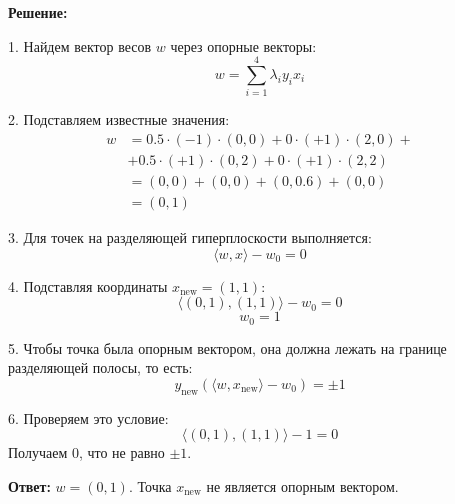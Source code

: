 \textbf{Решение:}
\par 1. Найдем вектор весов \(w\) через опорные векторы:
\begin{equation*}
    w = \sum_{i=1}^4 \lambda_i y_i x_i
\end{equation*}

\par 2. Подставляем известные значения:
\begin{align*}
    w & = 0.5 \cdot (-1) \cdot (0,0) + 0 \cdot (+1) \cdot (2,0) + \\
      & + 0.5 \cdot (+1) \cdot (0,2) + 0 \cdot (+1) \cdot (2,2)   \\
      & = (0,0) + (0,0) + (0,0.6) + (0,0)                         \\
      & = (0,1)
\end{align*}

\par 3. Для точек на разделяющей гиперплоскости выполняется:
\begin{equation*}
    \langle w,x \rangle - w_0 = 0
\end{equation*}

\par 4. Подставляя координаты \(x_{\text{new}} = (1,1)\):
\begin{equation*}
    \langle (0,1),(1,1) \rangle - w_0 = 0
\end{equation*}
\begin{equation*}
    w_0 = 1
\end{equation*}

\par 5. Чтобы точка была опорным вектором, она должна лежать на границе разделяющей полосы, то есть:
\begin{equation*}
    y_{\text{new}}(\langle w,x_{\text{new}} \rangle - w_0) = \pm 1
\end{equation*}

\par 6. Проверяем это условие:
\begin{equation*}
    \langle (0,1),(1,1) \rangle - 1 = 0
\end{equation*}
Получаем 0, что не равно $\pm1$.

\textbf{Ответ:} \(w = (0,1)\). Точка \(x_{\text{new}}\) не является опорным вектором.

